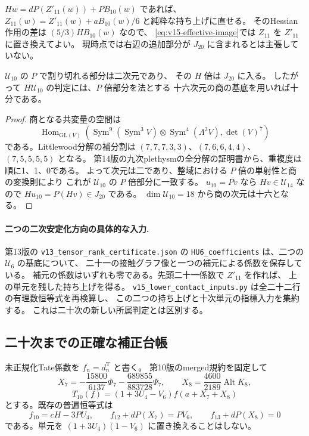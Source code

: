 \begin{remark}[単元を残した持ち上げ]
$Hw=dP(Z'_{11}(w))+PB_{10}(w)$ であれば、
$Z_{11}(w)=Z'_{11}(w)+aB_{10}(w)/6$ と純粋な持ち上げに直せる。
そのHessian作用の差は $(5/3)HB_{10}(w)$ なので、
\eqref{eq:v15-effective-image}では $Z_{11}$ を $Z'_{11}$ に置き換えてよい。
現時点では右辺の追加部分が $J_{20}$ に含まれるとは主張していない。
\end{remark}

\begin{proposition}
\label{prop:v15-pdivisible-tenth-unit}
$\mathcal U_{10}$ の $P$ で割り切れる部分は二次元であり、
その $H$ 倍は $J_{20}$ に入る。
したがって $H\mathcal U_{10}$ の判定には、$P$ 倍部分を法とする
十六次元の商の基底を用いれば十分である。
\end{proposition}

\begin{proof}
商となる共変量の空間は
\[
 \operatorname{Hom}_{\mathrm{GL}(V)}\left(
 \operatorname{Sym}^{9}(\operatorname{Sym}^3V)
 \otimes\operatorname{Sym}^{4}(\Lambda^2V),\det(V)^7\right)
\]
である。Littlewood分解の補分割は
$(7,7,7,3,3)$、$(7,6,6,4,4)$、$(7,5,5,5,5)$ となる。
第14版の九次plethysmの全分解の証明書から、重複度は順に1、1、0である。
よって次元は二であり、整域における $P$ 倍の単射性と商の変換則により
これが $\mathcal U_{10}$ の $P$ 倍部分に一致する。
$u_{10}=Pv$ なら $Hv\in\mathcal U_{14}$ なので
$Hu_{10}=P(Hv)\in J_{20}$ である。
$\dim\mathcal U_{10}=18$ から商の次元は十六となる。
\end{proof}

\paragraph{二つの二次安定化方向の具体的な入力.}
第13版の \texttt{v13\_tensor\_rank\_certificate.json} の
\texttt{HU6\_coefficients} は、二つの $\mathcal U_6$ の基底について、
二十一の接触グラフ像と一つの補元による係数を保存している。
補元の係数はいずれも零である。先頭二十一係数で $Z'_{11}$ を作れば、
上の単元を残した持ち上げを得る。
\nolinkurl{v15_lower_contact_inputs.py} は全二十二行の有理数恒等式を再検算し、
この二つの持ち上げと十次単元の指標入力を集約する。
これは二十次の新しい所属判定とは区別する。

\subsection{二十次までの正確な補正台帳}

未正規化Tate係数を $f_n=d_n^{\mathrm T}$ と書く。
第10版のmerged規約を固定して
\[
 X_7=-\frac{15800}{6137}\Phi_7-\frac{689855}{883728}\Psi_7,
 \qquad X_8=\frac{4600}{2189}\operatorname{Alt}K_8,
\]
\[
 T_{10}(f)=(1+3U_4-V_6)f(a+X_7+X_8)
\]
とする。既存の普遍恒等式は
\[
 f_{10}=cH-3PU_4,\qquad
 f_{12}+dP(X_7)=PV_6,\qquad f_{13}+dP(X_8)=0
\]
である。単元を $(1+3U_4)(1-V_6)$ に置き換えることはしない。

